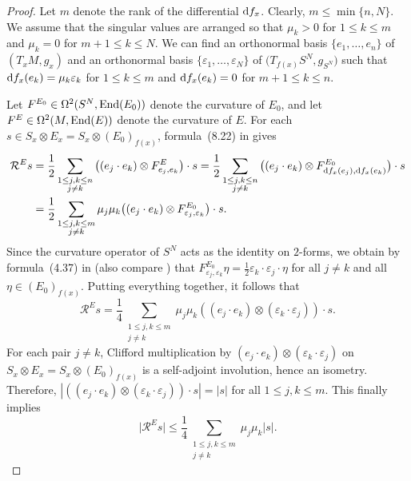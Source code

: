 \documentclass[pdftex]{sigma}
\numberwithin{equation}{section}
\begin{document}
\begin{proof}
Let $m$ denote the rank of the differential ${\rm d}f_x$. Clearly, $m \leq \min \{n,N\}$. We assume that the singular values are arranged so that $\mu_k > 0$ for $1 \leq k \leq m$ and $\mu_k = 0$ for $m+1 \leq k \leq N$. We can find an orthonormal basis $\{e_1,\hdots,e_n\}$ of $(T_x M, g_x)$ and an orthonormal basis $\{\varepsilon_1, \ldots, \varepsilon_N\}$ of $\big(T_{f(x)} S^N, g_{S^N}\big)$ such that ${\rm d}f_x(e_k) = \mu_k \varepsilon_k$ for $1 \leq k \leq m$ and ${\rm d}f_x(e_k) = 0$ for $m+1 \leq k \leq n$.

Let $F^{E_0} \in \Omega^2(S^N, {\rm End}(E_0))$ denote the curvature of $E_0$, and let $F^E \in \Omega^2(M, {\rm End}(E))$ denote the curvature of $E$. For each $s \in S_x \otimes E_x = S_x \otimes (E_0)_{f(x)}$, formula~(8.22) in \cite[Chapter II]{Lawson-Michelsohn} gives
\begin{align*}
\mathcal{R}^E s
&= \frac{1}{2} \sum_{\substack{1 \leq j,k \leq n\\ j \neq k}} \big((e_j \cdot e_k) \otimes F^E_{e_j, e_k}\big) \cdot s = \frac{1}{2} \sum_{\substack{1 \leq j,k \leq n\\ j \neq k}} \big((e_j \cdot e_k) \otimes F^{E_0}_{{\rm d}f_x(e_j), {\rm d}f_x(e_k)}\big) \cdot s \\
&= \frac{1}{2} \sum_{\substack{1 \leq j,k \leq m\\ j \neq k}} \mu_j \mu_k \big((e_j \cdot e_k) \otimes F^{E_0}_{\varepsilon_j,\varepsilon_k}\big) \cdot s.
\end{align*}
Since the curvature operator of $S^N$ acts as the identity on $2$-forms, we obtain by formula~(4.37) in \cite[Chapter II]{Lawson-Michelsohn} (also compare \cite[Lemma 4.3]{Llarull}) that $F^{E_0}_{\varepsilon_j,\varepsilon_k} \eta = \frac{1}{2} \varepsilon_k \cdot \varepsilon_j \cdot \eta$ for all $j \neq k$ and all $\eta \in (E_0)_{f(x)}$.
Putting everything together, it follows that
\[
 \mathcal{R}^E s = \frac{1}{4} \sum_{\substack{1 \leq j,k \leq m\\ j \neq k}} \mu_j \mu_k ((e_j \cdot e_k) \otimes (\varepsilon_k \cdot \varepsilon_j)) \cdot s.
\]
For each pair $j \neq k$, Clifford multiplication by $(e_j \cdot e_k) \otimes (\varepsilon_k \cdot \varepsilon_j)$ on $S_x \otimes E_x = S_x \otimes (E_0)_{f(x)}$ is a self-adjoint involution, hence an isometry.
Therefore, $
 |((e_j \cdot e_k) \otimes (\varepsilon_k \cdot \varepsilon_j)) \cdot s| = |s|$ for all $1 \leq j,k \leq m$.
This finally implies
\begin{equation*}
\big|\mathcal{R}^E s\big| \leq \frac{1}{4} \sum_{\substack{1 \leq j,k \leq m\\ j \neq k}} \mu_j \mu_k |s|.\tag*{\qed}
\end{equation*} \renewcommand{\qed}{}
\end{proof}
\end{document}
